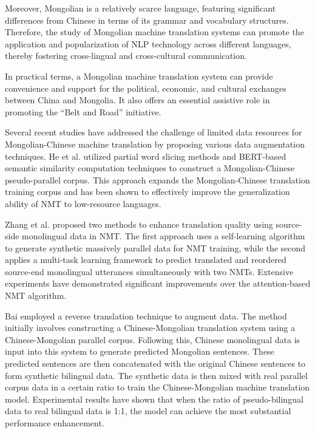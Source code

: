 \documentclass[acmsmall]{acmart}
\begin{document}
Moreover, Mongolian is a relatively scarce language, featuring significant differences from Chinese in terms of its grammar and vocabulary structures. Therefore, the study of Mongolian machine translation systems can promote the application and popularization of NLP technology across different languages, thereby fostering cross-lingual and cross-cultural communication. 

In practical terms, a Mongolian machine translation system can provide convenience and support for the political, economic, and cultural exchanges between China and Mongolia. It also offers an essential assistive role in promoting the ``Belt and Road'' initiative. 

Several recent studies have addressed the challenge of limited data resources for Mongolian-Chinese machine translation by proposing various data augmentation techniques. He et al. \cite{4-2} utilized partial word slicing methods and BERT-based semantic similarity computation techniques to construct a Mongolian-Chinese pseudo-parallel corpus. This approach expands the Mongolian-Chinese translation training corpus and has been shown to effectively improve the generalization ability of NMT to low-resource languages.

Zhang et al. \cite{4-2b1} proposed two methods to enhance translation quality using source-side monolingual data in NMT. The first approach uses a self-learning algorithm to generate synthetic massively parallel data for NMT training, while the second applies a multi-task learning framework to predict translated and reordered source-end monolingual utterances simultaneously with two NMTs. Extensive experiments have demonstrated significant improvements over the attention-based NMT algorithm.

Bai \cite{4-2b2} employed a reverse translation technique to augment data. The method initially involves constructing a Chinese-Mongolian translation system using a Chinese-Mongolian parallel corpus. Following this, Chinese monolingual data is input into this system to generate predicted Mongolian sentences. These predicted sentences are then concatenated with the original Chinese sentences to form synthetic bilingual data. The synthetic data is then mixed with real parallel corpus data in a certain ratio to train the Chinese-Mongolian machine translation model. Experimental results have shown that when the ratio of pseudo-bilingual data to real bilingual data is 1:1, the model can achieve the most substantial performance enhancement.
\end{document}
